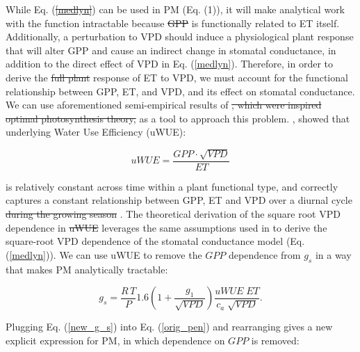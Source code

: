 \documentclass[hess, manuscript]{copernicus}
\providecommand{\DIFaddtex}[1]{{\protect\color{blue}\uwave{#1}}} %
\providecommand{\DIFdeltex}[1]{{\protect\color{red}\sout{#1}}}                      %
\providecommand{\DIFaddbegin}{} %
\providecommand{\DIFaddend}{} %
\providecommand{\DIFdelbegin}{} %
\providecommand{\DIFdelend}{} %
\providecommand{\DIFadd}[1]{\texorpdfstring{\DIFaddtex{#1}}{#1}} %
\providecommand{\DIFdel}[1]{\texorpdfstring{\DIFdeltex{#1}}{}} %
\begin{document}
\DIFaddend While Eq. (\DIFdelbegin \DIFdel{\ref{medlyn}}\DIFdelend \DIFaddbegin \DIFadd{3}\DIFaddend ) can be used in PM (Eq. (1)), it will make
analytical work with the function intractable because \DIFdelbegin \DIFdel{GPP }\DIFdelend \DIFaddbegin \DIFadd{$GPP$ }\DIFaddend is
functionally related to ET itself. Additionally, a perturbation to VPD
should induce a physiological plant response that will alter GPP and
cause an indirect change in stomatal conductance, in addition to the
direct effect of VPD in Eq. (\ref{medlyn}). Therefore, in order to
derive the \DIFdelbegin \DIFdel{full plant }\DIFdelend response of ET to VPD, we must account for the functional
relationship between GPP, ET, and VPD, and its effect on stomatal
conductance. We can use aforementioned semi-empirical results of
\citet{Zhou_2015} \DIFdelbegin \DIFdel{, which were inspired optimal photosynthesis
theory, }\DIFdelend as a tool to approach this
problem. \citet{Zhou_2015}, showed that  underlying Water Use
Efficiency (uWUE):

  \begin{equation}
    uWUE = \frac{GPP \cdot \sqrt{VPD}}{ET}
    \label{uwue}
  \end{equation}

is relatively constant across time \DIFaddbegin \DIFadd{and moisture conditions }\DIFaddend within a
plant functional type, and correctly captures a constant relationship
between GPP, ET and VPD over a diurnal cycle \DIFdelbegin \DIFdel{during the growing season
  }\DIFdelend \citep{Zhou_2014}. The
theoretical derivation of the square root VPD dependence in \DIFdelbegin \DIFdel{uWUE }\DIFdelend \DIFaddbegin \DIFadd{$uWUE$
}\DIFaddend leverages the same assumptions used in \cite{MEDLYN_2011} to derive the
square-root VPD dependence of the stomatal conductance model (Eq.
(\ref{medlyn})).  We can use uWUE to remove the $GPP$ dependence from
$g_s$ in a way that makes PM analytically tractable:

  \begin{equation}
    g_s = \frac{R \, T}{P} 1.6 \left(1 + \frac{g_1}{\sqrt{VPD}}\right) \frac{uWUE \; ET}{c_a \; \sqrt{VPD}}.
    \label{new_g_s}
  \end{equation}

Plugging Eq. (\ref{new_g_s}) into Eq. (\ref{orig_pen}) and
rearranging gives a new explicit expression for PM, in which
dependence on $GPP$ is removed:
\end{document}
